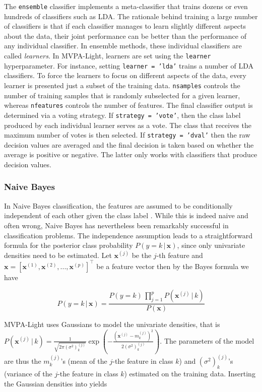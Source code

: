 \documentclass[utf8]{frontiersSCNS} %
\newcommand{\mf}[2]{m_#1^{(#2)}}
\newcommand{\sig}[2]{(\sigma^2)_#1^{(#2)}}
\newcommand{\x}{\mathbf{x}}
\newcommand{\xf}[1]{\mathbf{x}^{(#1)}} %
\newcommand{\ttt}[1]{\texttt{#1}}
\begin{document}
The \ttt{ensemble} classifier implements a meta-classifier that trains dozens
or even hundreds of classifiers such as LDA. The rationale behind training a large number of classifiers is that if each classifier manages to learn slightly different aspects about the data, their joint performance can be better than the performance of any individual classifier.
In ensemble methods, these individual classifiers are called \textit{learners}. In MVPA-Light, learners are set using the \ttt{learner} hyperparameter. For instance, setting \ttt{learner = 'lda'} trains a number of LDA classifiers. To force the learners to focus on different aspects of the data, every learner is presented just a subset of the training data. \ttt{nsamples} controls the number of training samples that is randomly subselected for a given learner, whereas \ttt{nfeatures} controls the number of features.
The final classifier output is determined via a voting strategy. If \ttt{strategy = 'vote'}, then the class label produced by each individual learner serves as a vote. The class that receives the maximum number of votes is then selected. If \ttt{strategy = 'dval'}  then the raw decision values are averaged and the final decision is taken based on whether the average is positive or negative. The latter only works with classifiers that produce decision values.

\subsubsection{Naive Bayes}

In Naive Bayes classification, the features are assumed to be conditionally independent of each other given the class label \citep{Bishop2007}. While this is indeed naive and often wrong, Naive Bayes has nevertheless been remarkably successful in classification problems. The independence assumption leads to a straightforward formula for the posterior class probability $P(y = k\,|\,\x)$, since only univariate densities need to be estimated. Let $\xf{j}$ be the $j$-th feature and $\x = [\xf{1}, \xf{2}, ..., \xf{p}]^\top$ be a feature vector then by the Bayes formula we have

\begin{equation}
\label{eq:naive_bayes}
P(y = k\,|\,\x) = \frac{P(y = k)\,\prod_{j=1}^p P(\xf{j}\,|\,k)}{P(\x)}
\end{equation}

MVPA-Light uses Gaussians to model the univariate densities, that is $P(\xf{j}\,|\,k) = \frac{1}{\sqrt{2\pi\sig{k}{j}}} \exp(-\frac{(\xf{j} - \mf{k}{j})^2}{2\sig{k}{j}})$. The parameters of the model are thus the $\mf{k}{j}$'s (mean of the $j$-the feature in class $k$) and $\sig{k}{j}$'s (variance of the $j$-the feature in class $k$) estimated on the training data. Inserting the Gaussian densities into  yields
\end{document}
